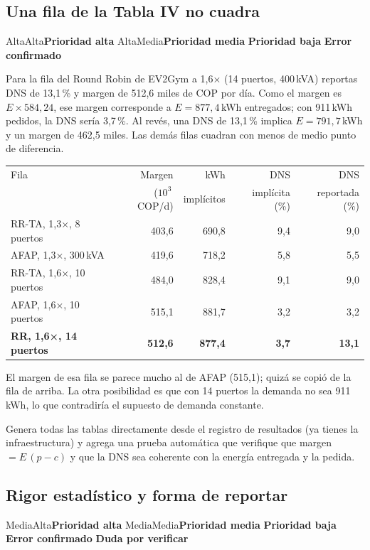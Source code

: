 \documentclass[11pt]{article}
\newcommand{\prioridad}[1]{%
  \def\tmpA{Alta}\def\tmpM{Media}\def\tmp{#1}%
  \ifx\tmp\tmpA\colorbox{rojoerror}{\color{white}\small\bfseries Prioridad alta}%
  \else\ifx\tmp\tmpM\colorbox{naranjatarea}{\color{white}\small\bfseries Prioridad media}%
  \else\colorbox{azulidea}{\color{white}\small\bfseries Prioridad baja}\fi\fi}
\newcommand{\confirmado}{\colorbox{rojoerror!15}{\small\bfseries\color{rojoerror} Error confirmado}}
\newcommand{\pordudar}{\colorbox{black!10}{\small\bfseries\color{black!75} Duda por verificar}}
\begin{document}
\subsection{Una fila de la Tabla IV no cuadra}
\prioridad{Alta} \confirmado

\begin{error}
Para la fila del Round Robin de EV2Gym a 1,6× (14 puertos, 400\,kVA) reportas DNS de 13,1\,\% y margen de 512,6 miles de COP por día. Como el margen es $E \times 584{,}24$, ese margen corresponde a $E = 877{,}4$\,kWh entregados; con 911\,kWh pedidos, la DNS sería 3,7\,\%. Al revés, una DNS de 13,1\,\% implica $E = 791{,}7$\,kWh y un margen de 462,5 miles. Las demás filas cuadran con menos de medio punto de diferencia.
\begin{center}
\small
\begin{tabular}{@{}lrrrr@{}}
\toprule
Fila & Margen & kWh & DNS & DNS \\
 & ($10^3$\,COP/d) & implícitos & implícita (\%) & reportada (\%) \\
\midrule
RR-TA, 1,3×, 8 puertos & 403,6 & 690,8 & 9,4 & 9,0 \\
AFAP, 1,3×, 300\,kVA & 419,6 & 718,2 & 5,8 & 5,5 \\
RR-TA, 1,6×, 10 puertos & 484,0 & 828,4 & 9,1 & 9,0 \\
AFAP, 1,6×, 10 puertos & 515,1 & 881,7 & 3,2 & 3,2 \\
\textbf{RR, 1,6×, 14 puertos} & \textbf{512,6} & \textbf{877,4} & \textbf{3,7} & \textbf{13,1} \\
\bottomrule
\end{tabular}
\end{center}
El margen de esa fila se parece mucho al de AFAP (515,1); quizá se copió de la fila de arriba. La otra posibilidad es que con 14 puertos la demanda no sea 911\,kWh, lo que contradiría el supuesto de demanda constante.
\end{error}

\begin{tarea}
Genera todas las tablas directamente desde el registro de resultados (ya tienes la infraestructura) y agrega una prueba automática que verifique que margen $= E\,(p-c)$ y que la DNS sea coherente con la energía entregada y la pedida.
\end{tarea}

\subsection{Rigor estadístico y forma de reportar}
\prioridad{Media} \confirmado{} \pordudar
\end{document}
